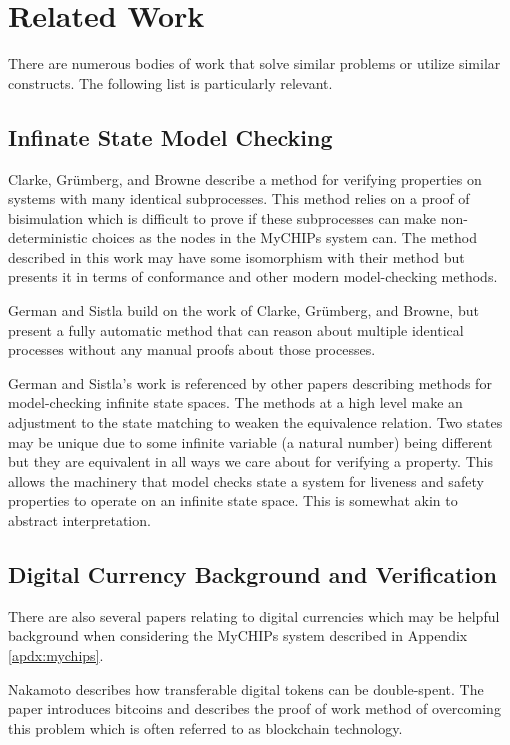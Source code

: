 \documentclass[runningheads]{llncs}
\newif\ifcomments
\newcommand{\krs}[1]{\ifcomments\textcolor{blue}{krs: #1}\fi}
\begin{document}
\section{Related Work}
\krs{Need to add sections about other results that use conformance, as well as infinite state model checking}


There are numerous bodies of work that solve similar problems or utilize similar constructs. The following list is particularly relevant. 

\subsection{Infinate State Model Checking}
Clarke, Grümberg, and Browne describe a method for verifying properties on systems with many identical subprocesses. This method relies on a proof of bisimulation which is difficult to prove if these subprocesses can make non-deterministic choices as the nodes in the MyCHIPs system can. The method described in this work may have some isomorphism with their method but presents it in terms of conformance and other modern model-checking methods. 

German and Sistla build on the work of Clarke, Grümberg, and Browne, but present a fully automatic method that can reason about multiple identical processes without any manual proofs about those processes. 

German and Sistla's work is referenced by other papers describing methods for model-checking infinite state spaces. The methods at a high level make an adjustment to the state matching to weaken the equivalence relation. Two states may be unique due to some infinite variable (a natural number) being different but they are equivalent in all ways we care about for verifying a property. This allows the machinery that model checks state a system for liveness and safety properties to operate on an infinite state space. This is somewhat akin to abstract interpretation. 

\subsection{Digital Currency Background and Verification}
There are also several papers relating to digital currencies which may be helpful background when considering the MyCHIPs system described in Appendix \ref{apdx:mychips}.

 Nakamoto describes how transferable digital tokens can be double-spent. The paper introduces bitcoins and describes the proof of work method of overcoming this problem which is often referred to as blockchain technology. \cite{bitcoin} 
\end{document}
